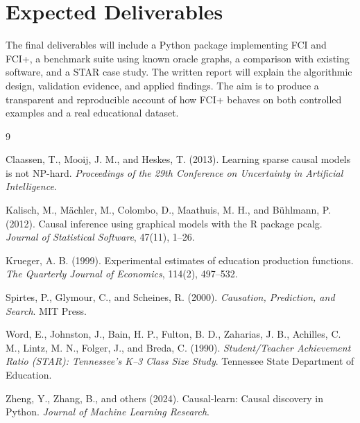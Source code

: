 \documentclass[11pt,a4paper]{article}
\begin{document}
\section*{Expected Deliverables}

The final deliverables will include a Python package implementing FCI and FCI+, a benchmark suite using known oracle graphs, a comparison with existing software, and a STAR case study. The written report will explain the algorithmic design, validation evidence, and applied findings. The aim is to produce a transparent and reproducible account of how FCI+ behaves on both controlled examples and a real educational dataset.

\begin{thebibliography}{9}

Claassen, T., Mooij, J. M., and Heskes, T. (2013).
Learning sparse causal models is not NP-hard.
\textit{Proceedings of the 29th Conference on Uncertainty in Artificial Intelligence}.

Kalisch, M., M{\"a}chler, M., Colombo, D., Maathuis, M. H., and B{\"u}hlmann, P. (2012).
Causal inference using graphical models with the R package pcalg.
\textit{Journal of Statistical Software}, 47(11), 1--26.

Krueger, A. B. (1999).
Experimental estimates of education production functions.
\textit{The Quarterly Journal of Economics}, 114(2), 497--532.

Spirtes, P., Glymour, C., and Scheines, R. (2000).
\textit{Causation, Prediction, and Search}.
MIT Press.

Word, E., Johnston, J., Bain, H. P., Fulton, B. D., Zaharias, J. B., Achilles, C. M., Lintz, M. N., Folger, J., and Breda, C. (1990).
\textit{Student/Teacher Achievement Ratio (STAR): Tennessee's K--3 Class Size Study}.
Tennessee State Department of Education.

Zheng, Y., Zhang, B., and others (2024).
Causal-learn: Causal discovery in Python.
\textit{Journal of Machine Learning Research}.

\end{thebibliography}
\end{document}
